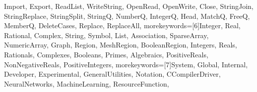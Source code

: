 {{    Import, Export, ReadList, WriteString, OpenRead, OpenWrite, Close,
    StringJoin, StringReplace, StringSplit, StringQ, NumberQ, IntegerQ,
    Head, MatchQ, FreeQ, MemberQ, DeleteCases, Replace, ReplaceAll},
  morekeywords={[6]Integer, Real, Rational, Complex, String, Symbol,
    List, Association, SparseArray, NumericArray,
    Graph, Region, MeshRegion, BooleanRegion,
    Integers, Reals, Rationals, Complexes, Booleans, Primes,
    Algebraics, PositiveReals, NonNegativeReals, PositiveIntegers},
  morekeywords={[7]System, Global, Internal, Developer, Experimental,
    GeneralUtilities, Notation, CCompilerDriver, NeuralNetworks,
    MachineLearning, ResourceFunction},
}


%

